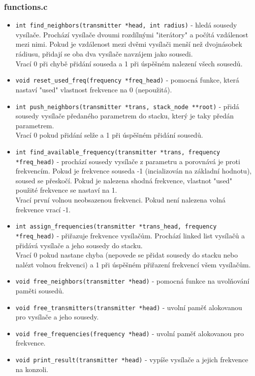 \documentclass[12pt]{article}
\begin{document}
\subsubsection{functions.c}
%
\begin{itemize}
	\item \texttt{int find\_neighbors(transmitter *head, int radius)} - 
		hledá sousedy vysílače. Prochází vysílače dvoumi rozdílnými
		"iterátory" a počítá vzdálenost mezi nimi. Pokud je vzdálenost
		mezi dvěmi vysílači menší než dvojnásobek rádiusu, přidají se
		oba dva vysílače navzájem jako sousedi.\\

		Vrací 0 při chybě přidání souseda a 1 při úspěšném nalezení
		všech sousedů.
	\item \texttt{void reset\_used\_freq(frequency *freq\_head)} - pomocná
		funkce, která nastaví "used" vlastnost frekvence na 0
		(nepoužitá).
	\item \texttt{int push\_neighbors(transmitter *trans,
		stack\_node **root)} - přidá sousedy vysílače předaného
		parametrem do stacku, který je taky předán parametrem.\\

		Vrací 0 pokud přidání selže a 1 při úspěšném přidání sousedů.
	\item \texttt{int find\_available\_frequency(transmitter *trans,
		frequency *freq\_head)} - prochází sousedy vysílače z 
		parametru a porovnává je proti frekvencím. Pokud je frekvence 
		souseda -1 (incializován na základní hodnotu), soused se 
		přeskočí. Pokud je nalezena shodná frekvence, vlastnot "used"
		použité frekvence se nastaví na 1.\\

		Vrací první volnou neobsazenou frekvenci. Pokud není nalezena 
		volná frekvence vrací -1.
	\item \texttt{int assign\_frequencies(transmitter *trans\_head,
		frequency *freq\_head)} - přiřazuje frekvence vysílačům. 
		Prochází linked list vysílačů a přidává vysílače a jeho sousedy
		do stacku.\\

		Vrací 0 pokud nastane chyba (nepovede se přidat sousedy do
		stacku nebo nalézt volnou frekvenci) a 1 při úspěšném 
		přiřazení frekvencí všem vysílačům.
	\item \texttt{void free\_neighbors(transmitter *head)} - pomocná funkce
		na uvolňování paměti sousedů.
	\item \texttt{void free\_transmitters(transmitter *head)} - uvolní paměť
		alokovanou pro vysílače a jeho sousedy.
	\item \texttt{void free\_frequencies(frequency *head)} - uvolní paměť
		alokovanou pro frekvence.
	\item \texttt{void print\_result(transmitter *head)} - vypíše vysílače
		a jejich frekvence na konzoli.
\end{itemize}
%
\end{document}
